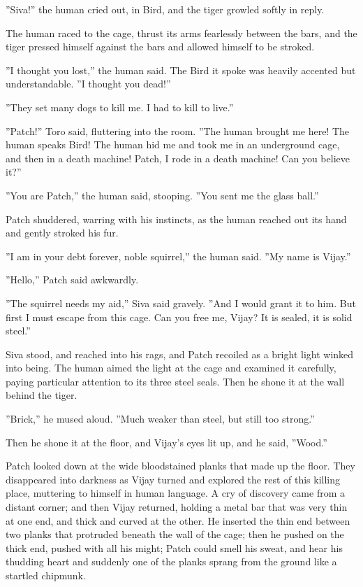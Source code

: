 \documentclass[12pt]{book}
\begin{document}
''Siva!'' the human cried out, in Bird, and the tiger growled softly in reply.

The human raced to the cage, thrust its arms fearlessly between the bars, and the tiger pressed himself against the bars and allowed himself to be stroked.

''I thought you lost,'' the human said. The Bird it spoke was heavily accented but understandable. ''I thought you dead!''

''They set many dogs to kill me. I had to kill to live.''

''Patch!'' Toro said, fluttering into the room. ''The human brought me here! The human speaks Bird! The human hid me and took me in an underground cage, and then in a death machine! Patch, I rode in a death machine! Can you believe it?''

''You are Patch,'' the human said, stooping. ''You sent me the glass ball.''

Patch shuddered, warring with his instincts, as the human reached out its hand and gently stroked his fur.

''I am in your debt forever, noble squirrel,'' the human said. ''My name is Vijay.''

''Hello,'' Patch said awkwardly.

''The squirrel needs my aid,'' Siva said gravely. ''And I would grant it to him. But first I must escape from this cage. Can you free me, Vijay? It is sealed, it is solid steel.''

Siva stood, and reached into his rags, and Patch recoiled as a bright light winked into being. The human aimed the light at the cage and examined it carefully, paying particular attention to its three steel seals. Then he shone it at the wall behind the tiger.

''Brick,'' he mused aloud. ''Much weaker than steel, but still too strong.''

Then he shone it at the floor, and Vijay's eyes lit up, and he said, ''Wood.''

Patch looked down at the wide bloodstained planks that made up the floor. They disappeared into darkness as Vijay turned and explored the rest of this killing place, muttering to himself in human language. A cry of discovery came from a distant corner; and then Vijay returned, holding a metal bar that was very thin at one end, and thick and curved at the other. He inserted the thin end between two planks that protruded beneath the wall of the cage; then he pushed on the thick end, pushed with all his might; Patch could smell his sweat, and hear his thudding heart %
and suddenly one of the planks sprang from the ground like a startled chipmunk.
\end{document}
